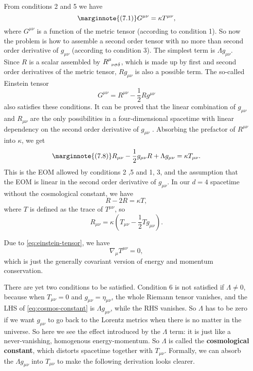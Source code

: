 \documentclass[hyperref, a4paper]{article}
\newcommand*{\concept}[1]{{\textbf{#1}}}
\begin{document}
From conditions 2 and 5 we have 
\begin{equation} \marginnote{(7.1)}
    G^{\mu \nu} = \kappa T^{\mu \nu},
\end{equation}
where $G^{\mu \nu}$ is a function of the metric tensor (according to condition 1). So now the problem is how to 
assemble a second order tensor with no more than second order derivative of $g_{\mu \nu}$ (according to 
condition 3). The simplest term is $\Lambda g_{\mu \nu}$. Since $R$ is a scalar assembled by 
$R\indices{^\mu_{\nu \sigma \delta}}$, which is made up by first and second order derivatives of the metric tensor,
$R g_{\mu \nu}$ is also a possible term. The so-called Einstein tensor 
\begin{equation}
    G^{\mu \nu} = R^{\mu \nu} - \frac{1}{2} R g^{\mu \nu}
\end{equation}
also satisfies these conditions. It can be proved that the linear combination of $g_{\mu \nu}$ and $R_{\mu \nu}$ are the only possibilities
in a four-dimensional spacetime with linear dependency on the second order derivative of $g_{\mu \nu}$ \cite{lovelock1972four}.
Absorbing the prefactor of $R^{\mu \nu}$ into $\kappa$, we get 
\begin{equation} \marginnote{(7.8)}
    R_{\mu \nu}-\frac{1}{2} g_{\mu \nu} R+\Lambda g_{\mu \nu} = \kappa T_{\mu \nu}.
    \label{eq:cosmos-constant}
\end{equation}
This is the EOM allowed by conditions 2 ,5 and 1, 3, and the assumption that the EOM is linear 
in the second order derivative of $g_{\mu \nu}$. In our $d=4$ spacetime without the cosmological
constant, we have 
\[
    R - 2 R = \kappa T,
\]
where $T$ is defined as the trace of $T^{\mu \nu}$, so 
\begin{equation}
    R_{\mu \nu} = \kappa \left(T_{\mu \nu} - \frac{1}{2} T g_{\mu \nu} \right).
    \label{eq:t-to-r}
\end{equation}

Due to \eqref{eq:einstein-tensor}, we have 
\begin{equation}
    \nabla_\mu T^{\mu \nu} = 0,
\end{equation}
which is just the generally covariant version of energy and momentum conservation. 

There are yet two conditions to be satisfied. Condition 6 is not satisfied if $\Lambda \neq 0$, 
because when $T_{\mu \nu} = 0$ and $g_{\mu \nu} = \eta_{\mu \nu}$, the whole Riemann tensor 
vanishes, and the LHS of \eqref{eq:cosmos-constant} is $\Lambda g_{\mu \nu}$, while the RHS vanishes.
So $\Lambda$ has to be zero if we want $g_{\mu \nu}$ to go back to the Lorentz metrics when 
there is no matter in the universe. So here we see the effect introduced by the $\Lambda$ term: 
it is just like a never-vanishing, homogenous energy-momentum. So $\Lambda$ is called the 
\concept{cosmological constant}, which distorts spacetime together with $T_{\mu \nu}$. 
Formally, we can absorb the $\Lambda g_{\mu \nu}$ into $T_{\mu \nu}$ to make the following derivation 
looks clearer. 
\end{document}
